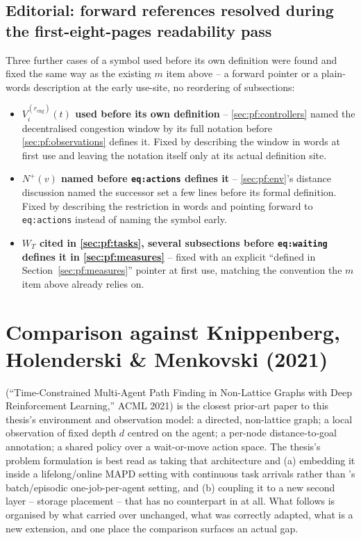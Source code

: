 \documentclass[11pt]{article}
\begin{document}
\subsection*{Editorial: forward references resolved during the first-eight-pages readability pass}
Three further cases of a symbol used before its own definition were found and
fixed the same way as the existing $m$ item above -- a forward pointer or a
plain-words description at the early use-site, no reordering of subsections:
\begin{itemize}
  \item \textbf{$V^{(r_{\mathrm{cng}})}_i(t)$ used before its own definition}
    -- \ref{sec:pf:controllers} named the decentralised congestion window by
    its full notation before \ref{sec:pf:observations} defines it. Fixed by
    describing the window in words at first use and leaving the notation
    itself only at its actual definition site.
  \item \textbf{$N^{+}(v)$ named before \texttt{eq:actions} defines it} --
    \ref{sec:pf:env}'s distance discussion named the successor set a few
    lines before its formal definition. Fixed by describing the restriction
    in words and pointing forward to \texttt{eq:actions} instead of naming
    the symbol early.
  \item \textbf{$W_T$ cited in \ref{sec:pf:tasks}, several subsections before
    \texttt{eq:waiting} defines it in \ref{sec:pf:measures}} -- fixed with an
    explicit ``defined in Section~\ref{sec:pf:measures}'' pointer at first
    use, matching the convention the $m$ item above already relies on.
\end{itemize}

\section{Comparison against Knippenberg, Holenderski \& Menkovski (2021)}
\label{sec:knippenberg}

\citet{knippenberg2021} (``Time-Constrained Multi-Agent Path Finding in
Non-Lattice Graphs with Deep Reinforcement Learning,'' ACML 2021) is the
closest prior-art paper to this thesis's environment and observation model:
a directed, non-lattice graph; a local observation of fixed depth $d$
centred on the agent; a per-node distance-to-goal annotation; a shared
policy over a wait-or-move action space. The thesis's problem formulation is
best read as taking that architecture and (a) embedding it inside a
lifelong/online MAPD setting with continuous task arrivals rather than
\citeauthor{knippenberg2021}'s batch/episodic one-job-per-agent setting, and
(b) coupling it to a new second layer -- storage placement -- that has no
counterpart in \citeauthor{knippenberg2021} at all. What follows is organised
by what carried over unchanged, what was correctly adapted, what is a new
extension, and one place the comparison surfaces an actual gap.
\end{document}
